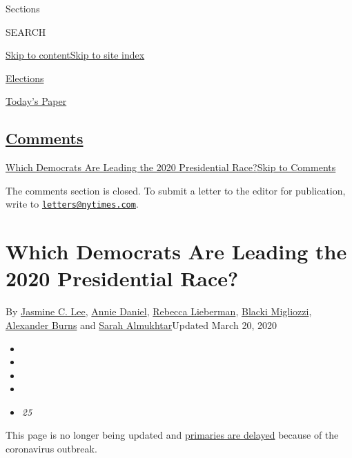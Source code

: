 Sections

SEARCH

\protect\hyperlink{site-content}{Skip to
content}\protect\hyperlink{site-index}{Skip to site index}

\href{https://www.nytimes.com/news-event/2020-election}{Elections}

\href{https://myaccount.nytimes.com/auth/login?response_type=cookie\&client_id=vi}{}

\href{https://www.nytimes.com/section/todayspaper}{Today's Paper}

\hypertarget{comments}{%
\subsection{\texorpdfstring{\protect\hyperlink{commentsContainer}{Comments}}{Comments}}\label{comments}}

\href{}{Which Democrats Are Leading the 2020 Presidential
Race?}\href{}{Skip to Comments}

The comments section is closed. To submit a letter to the editor for
publication, write to
\href{mailto:letters@nytimes.com}{\nolinkurl{letters@nytimes.com}}.

\hypertarget{which-democrats-are-leading-the-2020-presidential-race}{%
\section{Which Democrats Are Leading the 2020 Presidential
Race?}\label{which-democrats-are-leading-the-2020-presidential-race}}

By \href{https://www.nytimes.com/by/jasmine-c-lee}{Jasmine C. Lee},
\href{https://www.nytimes.com/by/annie-daniel}{Annie Daniel},
\href{https://www.nytimes.com/by/rebecca-lieberman}{Rebecca Lieberman},
\href{https://www.nytimes.com/by/blacki-migliozzi}{Blacki Migliozzi},
\href{https://www.nytimes.com/by/alexander-burns}{Alexander Burns} and
\href{https://www.nytimes.com/by/sarah-almukhtar}{Sarah
Almukhtar}Updated March 20, 2020

\begin{itemize}
\item
\item
\item
\item
\item
  \emph{25}
\end{itemize}

This page is no longer being updated and
\href{https://www.nytimes.com/interactive/2020/us/elections/delegate-count-primary-results.html}{primaries
are delayed} because of the coronavirus outbreak.

